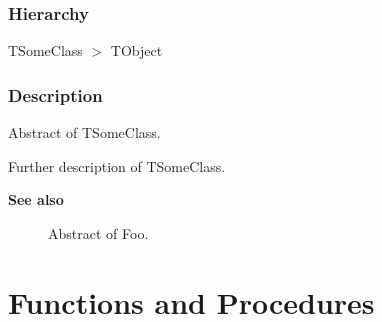 \documentclass{report}
\begin{document}
\subsubsection*{\large{\textbf{Hierarchy}}\normalsize\hspace{1ex}\hfill}
TSomeClass {$>$} TObject
\subsubsection*{\large{\textbf{Description}}\normalsize\hspace{1ex}\hfill}
Abstract of TSomeClass.\hfill\vspace*{1ex}

 Further description of TSomeClass.  \begin{list}{}{
\setlength{\itemindent}{0cm}
\setlength{\listparindent}{0cm}
\setlength{\leftmargin}{\evensidemargin}
\addtolength{\leftmargin}{\tmplength}
\settowidth{\labelsep}{X}
\addtolength{\leftmargin}{\labelsep}
\setlength{\labelwidth}{\tmplength}
}
\item[\textbf{See also}]
\begin{description}
\item[\begin{ttfamily}Foo\end{ttfamily}(\ref{ok_see_also-Foo})] 
Abstract of Foo.
\item[\begin{ttfamily}ok{\_}see{\_}also unit\end{ttfamily}(\ref{ok_see_also})] 

\end{description}
\end{list}
\section{Functions and Procedures}
\end{document}
